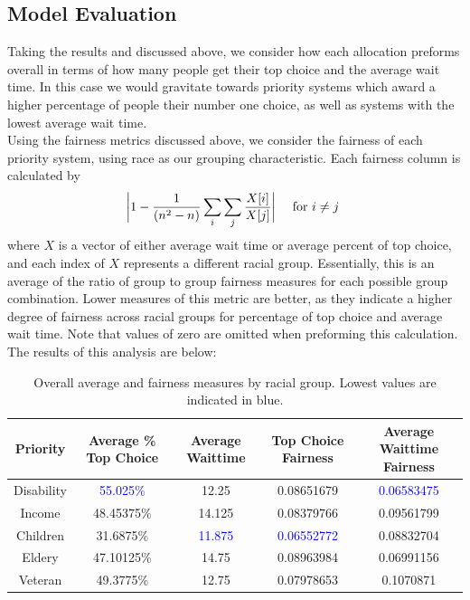 \documentclass[11pt]{article}
\begin{document}
\subsection{Model Evaluation}
Taking the results and discussed above, we consider how each allocation preforms overall in terms of how many people get their top choice and the average wait time. In this case we would gravitate towards priority systems which award a higher percentage of people their number one choice, as well as systems with the lowest average wait time. \\
\newline
Using the fairness metrics discussed above, we consider the fairness of each priority system, using race as our grouping characteristic. Each fairness column is calculated by
$$
\biggr{|}1 - \frac{1}{(n^2 - n)}\sum_i \sum_j \frac{X[i]}{X[j]}\biggr{|} \quad \text{ for } i \neq j\
$$
where $X$ is a vector of either average wait time or average percent of top choice, and each index of $X$ represents a different racial group. Essentially, this is an average of the ratio of group to group fairness measures for each possible group combination. Lower measures of this metric are better, as they indicate a higher degree of fairness across racial groups for percentage of top choice and average wait time. Note that values of zero are omitted when preforming this calculation.\\
\newline
The results of this analysis are below:
    \begin{table}[H]
        \centering
        \begin{tabular}{c|c|c|c|c}
             Priority &  Average \% Top Choice & Average Waittime & Top Choice Fairness & Average Waittime Fairness \\
             \hline
             Disability & \textcolor{blue}{55.025\%} & 12.25 & 0.08651679 & \textcolor{blue}{0.06583475}\\
             Income & 48.45375\% & 14.125 & 0.08379766 &  0.09561799\\
             Children & 31.6875\% & \textcolor{blue}{11.875} & \textcolor{blue}{0.06552772} &  0.08832704 \\
             Eldery & 47.10125\% & 14.75 & 0.08963984 & 0.06991156 \\
             Veteran & 49.3775\% & 12.75 & 0.07978653 & 0.1070871 \\
        \end{tabular}
        \caption{Overall average and fairness measures by racial group. Lowest values are indicated in blue.}
        \label{tab:my_label}
    \end{table}
\newline
\end{document}
